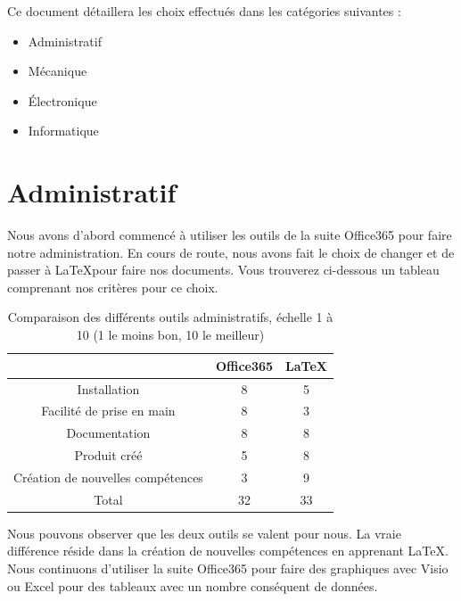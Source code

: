 \documentclass[
	a4paper,									%
	11pt,										%
	twoside,									%
	openright,									%
	notitlepage,									%
	parskip=half,								%
]{scrreprt}										%
\begin{document}
Ce document détaillera les choix effectués dans les catégories suivantes : 

\begin{itemize}
	\item Administratif
	\item Mécanique
	\item Électronique
	\item Informatique
\end{itemize}



\chapter{Administratif}

Nous avons d'abord commencé à utiliser les outils de la suite Office365 pour faire notre administration. 
En cours de route, nous avons fait le choix de changer et de passer à \LaTeX pour faire nos documents. 
Vous trouverez ci-dessous un tableau comprenant nos critères pour ce choix. 

\begin{table}[h!]
    \begin{center}
        \vspace{5mm}
        \label{tab:table1}
        \begin{tabular}{c|c|c} %
            \toprule
            \textbf{ } & \textbf{Office365} & \textbf{\LaTeX}\\
            \midrule
            Installation & 8 & 5\\
            Facilité de prise en main & 8 & 3\\
            Documentation & 8 & 8 \\
            Produit créé & 5 & 8 \\
			Création de nouvelles compétences & 3 & 9\\
			\midrule
			Total & 32 & 33\\
            \bottomrule
			
        \end{tabular}
    \end{center}    
	\caption{Comparaison des différents outils administratifs, échelle 1 à 10 (1 le moins bon, 10 le meilleur)}
\end{table}

Nous pouvons observer que les deux outils se valent pour nous. La vraie différence réside dans la création
de nouvelles compétences en apprenant \LaTeX. Nous continuons d'utiliser la suite Office365 pour faire 
des graphiques avec Visio ou Excel pour des tableaux avec un nombre conséquent de données. \par
\end{document}
